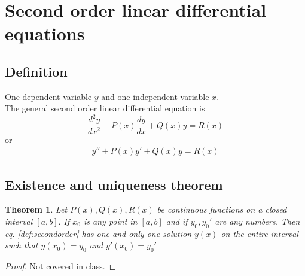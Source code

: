\documentclass[oneside,11pt,pdftex,final]{book}%
\numberwithin{equation}{section}
\newtheorem{theorem}{Theorem}[chapter]%
\numberwithin{section}{chapter}
\numberwithin{equation}{chapter}
\begin{document}
\section{Second order linear differential equations}
\subsection{Definition}
One dependent variable $ y $ and one independent variable $ x $.\\
The general second order linear differential equation is \[ \frac{d^2y}{dx^2} + P(x)\frac{dy}{dx}+Q(x)y=R(x)\]
or 
\begin{align} \label{def:secondorder}
	y''+P(x) y'+Q(x)y=R(x)
\end{align}

\subsection{Existence and uniqueness theorem}
\begin{theorem}
Let $ P(x), Q(x), R(x)$ be continuous functions on a closed interval $ [a,b].$ If $ x_0 $ is any point in $ [a,b] $ and if $ y_0, y_0' $ are any numbers. Then eq. \ref{def:secondorder} has one and only one solution $ y(x) $ on the entire interval such that $ y(x_0) =y_0$ and $ y'(x_0) =y_0'$
\end{theorem}
\begin{proof}
	Not covered in class.
\end{proof}
\end{document}

